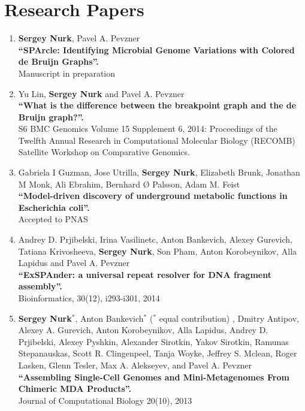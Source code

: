 \section{Research Papers}
%
\begin{enumerate}
\item 
\textbf{Sergey Nurk}, Pavel A. Pevzner\\
\textbf{``SPArcle: Identifying Microbial Genome Variations with Colored de Bruijn Graphs''.} \\
Manuscript in preparation

\item 
Yu Lin, \textbf{Sergey Nurk} and Pavel A. Pevzner\\
\textbf{``What is the difference between the breakpoint graph and the de Bruijn graph?''.} \\
S6 BMC Genomics Volume 15 Supplement 6, 2014: Proceedings of the Twelfth Annual Research in Computational Molecular Biology (RECOMB) Satellite Workshop on Comparative Genomics.

\item Gabriela I Guzman, Jose Utrilla, \textbf{Sergey Nurk}, Elizabeth Brunk, Jonathan M Monk, Ali Ebrahim, Bernhard Ø Palsson, Adam M. Feist\\
\textbf{``Model-driven discovery of underground metabolic functions in Escherichia coli''.} \\
Accepted to PNAS

\item Andrey D. Prjibelski, Irina Vasilinetc, Anton Bankevich, Alexey Gurevich, Tatiana Krivosheeva, \textbf{Sergey Nurk}, Son Pham, Anton Korobeynikov, Alla Lapidus and Pavel A. Pevzner\\
\textbf{``ExSPAnder: a universal repeat resolver for DNA fragment assembly''.} \\
Bioinformatics, 30(12), i293-i301, 2014

\item \textbf{Sergey Nurk}$^*$, Anton Bankevich$^*$ ($^*$ equal contribution)%
, Dmitry Antipov, Alexey A. Gurevich, Anton Korobeynikov, Alla Lapidus, Andrey D. Prjibelski, Alexey Pyshkin, Alexander Sirotkin, Yakov Sirotkin, Ramunas Stepanauskas, Scott R. Clingenpeel, Tanja Woyke, Jeffrey S. Mclean, Roger Lasken, Glenn Tesler, Max A. Alekseyev, and Pavel A. Pevzner \\
\textbf{``Assembling Single-Cell Genomes and Mini-Metagenomes From Chimeric MDA Products''.} \\
Journal of Computational Biology 20(10), 2013


\end{enumerate}
